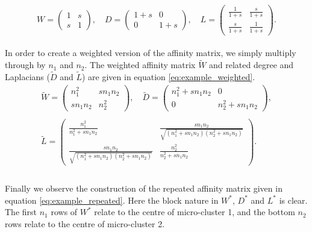 \begin{equation}
  \label{eq:example_centers}
 W = \left(
  \begin{array}{cc}
    1 & s \\
    s & 1
  \end{array} \right), \quad
%
 D = \left(
  \begin{array}{cc}
    1+s & 0 \\
    0 & 1+s
  \end{array} \right), \quad
%
 L = \left(
  \begin{array}{cc}
    \frac{1}{1+s} & \frac{s}{1+s} \\
    \frac{s}{1+s} & \frac{1}{1+s} 
  \end{array} \right). 
\end{equation}
\\
In order to create a weighted version of the affinity matrix, we simply multiply through by $n_1$ and $n_2$. The weighted affinity matrix $\tilde{W}$ and related degree and Laplacians ($\tilde{D}$ and $\tilde{L}$) are given in equation \eqref{eq:example_weighted}.%
\\
\begin{equation}
\begin{gathered}
 \tilde{W} = \left(
  \begin{array}{cc}
    n_1^2 & sn_1n_2 \\
    sn_1n_2 & n_2^2
  \end{array} \right) , \quad 
%
 \tilde{D} = \left(
  \begin{array}{cc}
    n_1^2 + sn_1n_2 & 0 \\
    0 & n_2^2 + sn_1n_2
  \end{array} \right), \\ \\ 
 \tilde{L} = \left(
  \begin{array}{cc}
   \frac{n_1^2}{n_1^2+sn_1n_2} & \frac{sn_1n_2}{\sqrt{(n_1^2+sn_1n_2)(n_2^2+sn_1n_2)}} \\
   \frac{sn_1n_2}{\sqrt{(n_1^2+sn_1n_2)(n_2^2+sn_1n_2)}} &  \frac{n_2^2}{n_2^2+sn_1n_2}
  \end{array} \right). \\
\end{gathered} \label{eq:example_weighted} 
\end{equation}
\\
Finally we observe the construction of the repeated affinity matrix given in equation \eqref{eq:example_repeated}. Here the block nature in $W^*$, $D^*$ and $L^*$ is clear. The first $n_1$ rows of $W^*$ relate to the centre of micro-cluster 1, and the bottom $n_2$ rows relate to the centre of micro-cluster 2.

